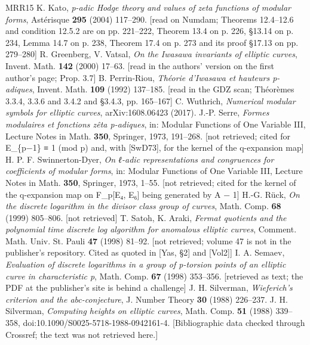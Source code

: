 \documentclass[11pt,a4paper]{article}
\theoremstyle{named}
\begin{document}
\begin{thebibliography}{MRR15}
 K. Kato, \textit{p-adic Hodge theory and values of zeta functions of modular forms}, Astérisque \textbf{295} (2004) 117–290. [read on Numdam; Theorems 12.4–12.6 and condition 12.5.2 are on pp. 221–222, Theorem 13.4 on p. 226, §13.14 on p. 234, Lemma 14.7 on p. 238, Theorem 17.4 on p. 273 and its proof §17.13 on pp. 279–280]
 R. Greenberg, V. Vatsal, \textit{On the Iwasawa invariants of elliptic curves}, Invent. Math. \textbf{142} (2000) 17–63. [read in the authors' version on the first author's page; Prop. 3.7]
 B. Perrin-Riou, \textit{Théorie d'Iwasawa et hauteurs p-adiques}, Invent. Math. \textbf{109} (1992) 137–185. [read in the GDZ scan; Théorèmes 3.3.4, 3.3.6 and 3.4.2 and §3.4.3, pp. 165–167]
 C. Wuthrich, \textit{Numerical modular symbols for elliptic curves}, arXiv:1608.06423 (2017).
 J.-P. Serre, \textit{Formes modulaires et fonctions zêta p-adiques}, in: Modular Functions of One Variable III, Lecture Notes in Math. \textbf{350}, Springer, 1973, 191–268. [not retrieved; cited for E\_\{p−1\} ≡ 1 (mod p) and, with [SwD73], for the kernel of the q-expansion map]
 H. P. F. Swinnerton-Dyer, \textit{On ℓ-adic representations and congruences for coefficients of modular forms}, in: Modular Functions of One Variable III, Lecture Notes in Math. \textbf{350}, Springer, 1973, 1–55. [not retrieved; cited for the kernel of the q-expansion map on F\_p[E₄, E₆] being generated by A − 1]
 H.-G. Rück, \textit{On the discrete logarithm in the divisor class group of curves}, Math. Comp. \textbf{68} (1999) 805–806. [not retrieved]
 T. Satoh, K. Araki, \textit{Fermat quotients and the polynomial time discrete log algorithm for anomalous elliptic curves}, Comment. Math. Univ. St. Pauli \textbf{47} (1998) 81–92. [not retrieved; volume 47 is not in the publisher's repository. Cited as quoted in [Yas, §2] and [Vol2]]
 I. A. Semaev, \textit{Evaluation of discrete logarithms in a group of p-torsion points of an elliptic curve in characteristic p}, Math. Comp. \textbf{67} (1998) 353–356. [retrieved as text; the PDF at the publisher's site is behind a challenge]
 J. H. Silverman, \textit{Wieferich's criterion and the abc-conjecture}, J. Number Theory \textbf{30} (1988) 226–237.
 J. H. Silverman, \textit{Computing heights on elliptic curves}, Math. Comp. \textbf{51} (1988) 339–358, doi:10.1090/S0025-5718-1988-0942161-4. [Bibliographic data checked through Crossref; the text was not retrieved here.]

\end{thebibliography}
\end{document}
